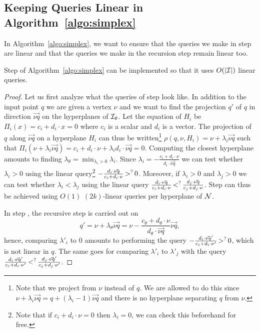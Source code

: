 \subsection{Keeping Queries Linear in Algorithm~\ref*{algo:simplex}}%
\label{app:keeplinear}

In Algorithm~\ref{algo:simplex}, we want to ensure that the queries we make in step
 are linear and that the queries we make in the recursion step
remain linear too.
\begin{lemma}
	Step  of
	Algorithm~\ref{algo:simplex} can be implemented so that it uses
	$O(|{\mathcal{I}}|)$ linear queries.
\end{lemma}%
\begin{proof}
Let us first analyze what the queries of step  look like. In addition
to the input point \(q\) we are given a vertex \(\nu\) and we want to find the
projection \(q'\) of \(q\) in direction \(\vec{\nu q}\) on the hyperplanes of
\(\mathcal{I}_{\theta}\). Let the equation of \(H_{i}\) be \(\Pi_{i}(x) =
c_{i} + d_{i}
\cdot x = 0\) where \(c_{i}\) is a scalar and \(d_{i}\) is a
vector.
The projection of \(q\) along \(\vec{\nu q}\) on a hyperplane \(H_i\) can thus
be written\footnote{Note that we project from \(\nu\) instead of \(q\). We are
allowed to do this since \(\nu + \lambda_{i} \vec{\nu q} = q + (\lambda_i - 1)
\vec{\nu q}\) and there is no hyperplane
separating \(q\) from \(\nu\).}
\(\rho(q,\nu,H_i) = \nu + \lambda_{i} \vec{\nu q}\) such that \(\Pi_{i}(\nu +
		\lambda_{i} \vec{\nu q}) = c_{i} + d_{i} \cdot \nu +
		\lambda_{i} d_{i} \cdot
\vec{\nu q} = 0\). Computing the closest hyperplane amounts to finding
\(\lambda_{\theta} = \min_{\lambda_i > 0} \lambda_i\). Since \(\lambda_i = -
\frac{c_i + d_i \cdot \nu}{d_i \cdot \vec{\nu q}}\) we can test whether
\(\lambda_i > 0\)
using the linear query\footnote{Note that if $c_i + d_i \cdot \nu = 0$ then
$\lambda_i=0$, we can check this beforehand for free.}
\(-\frac{d_i \cdot \vec{\nu q}}{c_i + d_i
\cdot \nu} \mathop{>}^{?} 0\). Moreover, if \(\lambda_i > 0\) and \(\lambda_j > 0\)
we can test whether $\lambda_i < \lambda_j$ using the linear query \(
\frac{d_i \cdot \vec{\nu q}}{c_i + d_i \cdot \nu}
\mathop{<}^{?}
\frac{d_j \cdot \vec{\nu q}}{c_j + d_j \cdot \nu}\).
Step  can thus be achieved using \(O(1)\) \((2k)\)-linear queries per
hyperplane of \(\mathcal{N}\).

In step , the
recursive step is carried out on
\[
	q' = \nu + \lambda_{\theta} \vec{\nu q} = \nu -
\frac{c_{\theta} + d_{\theta} \cdot \nu}{d_{\theta} \cdot \vec{\nu q}}
\vec{\nu q},
\]
hence, comparing \(\lambda'_i\) to \(0\) amounts to performing the
query \(-\frac{d_i \cdot \vec{\nu q}'}{c_i + d_i \cdot \nu'}
\mathop{>}^{?} 0\), which is not linear in \(q\). The same goes for comparing
\(\lambda'_i\) to \(\lambda'_j\) with the query
\(\frac{d_i \cdot \vec{\nu q}'}{c_i + d_i \cdot \nu'}
\mathop{<}^{?}
\frac{d_j \cdot \vec{\nu q}'}{c_j + d_j \cdot \nu'}\).


\end{proof}
